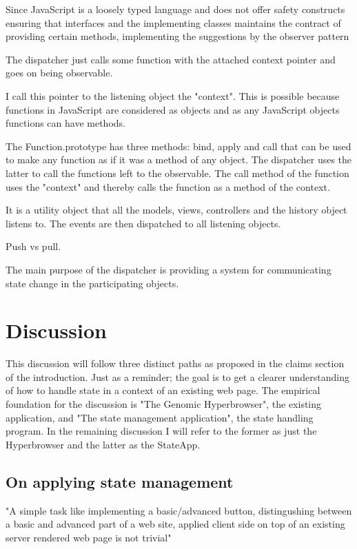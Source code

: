\documentclass[english]{ifimaster}
\begin{document}
Since JavaScript is a loosely typed language and does not offer safety constructs ensuring that interfaces and the implementing classes maintains the contract of providing certain methods, implementing the suggestions by the observer pattern  

The dispatcher just calls some function with the attached context pointer and goes on being observable. 

I call this pointer to the listening object the "context". This is possible because functions in JavaScript are considered as objects and as any JavaScript objects functions can have methods.

The Function.prototype has three methods: bind, apply and call that can be used to make any function as if it was a method of any object. The dispatcher uses the latter to call the functions left to the observable. The call method of the function uses the "context" and thereby calls the function as a method of the context.

It is a utility object that all the models, views, controllers and the history object listens to. The events are then dispatched to all listening objects. 

Push vs pull.

The main purpose of the dispatcher is providing a system for communicating state change in the participating objects.  

\part{Discussion}

This discussion will follow three distinct paths as proposed in the claims section of the introduction. Just as a reminder; the goal is to get a clearer understanding of how to handle state in a context of an existing web page. The empirical foundation for the discussion is "The Genomic Hyperbrowser", the existing application, and "The state management application", the state handling program. In the remaining discussion I will refer to the former as just the Hyperbrowser and the latter as the StateApp.

\chapter{On applying state management}

"A simple task like implementing a basic/advanced button, distingushing between a basic and advanced part of a web site, applied client side on top of an existing server rendered web page is not trivial"
\end{document}

